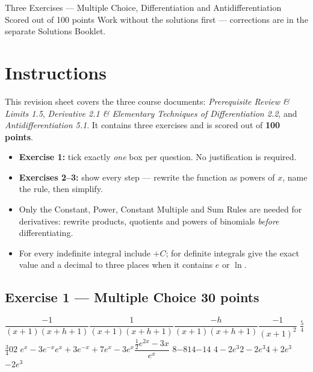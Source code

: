 \documentclass[11pt]{article}
\begin{document}
%
{Three Exercises --- Multiple Choice, Differentiation and Antidifferentiation\\ Scored out of 100 points}%
{Work without the solutions first --- corrections are in the separate Solutions Booklet.}

\section*{Instructions}
\studentbox
\bigskip
This revision sheet covers the three course documents: \emph{Prerequisite Review \& Limits 1.5},
\emph{Derivative 2.1 \& Elementary Techniques of Differentiation 2.2}, and
\emph{Antidifferentiation 5.1}. It contains three exercises and is scored out of \textbf{100 points}.
\begin{itemize}[itemsep=2pt]
  \item \textbf{Exercise 1:} tick exactly \emph{one} box per question. No justification is required.
  \item \textbf{Exercises 2--3:} show every step --- rewrite the function as powers of $x$, name the rule, then simplify.
  \item Only the Constant, Power, Constant Multiple and Sum Rules are needed for derivatives: rewrite products, quotients and powers of binomials \emph{before} differentiating.
  \item For every indefinite integral include $+C$; for definite integrals give the exact value and a decimal to three places when it contains $e$ or $\ln$.
\end{itemize}
\scoretable

\newpage
\subsection*{Exercise 1 --- Multiple Choice \hfill {\normalsize\color{fnavy}30 points}}
\begin{enumerate}[label=\textbf{Q\arabic*.},leftmargin=*,itemsep=10pt]
  {$\dfrac{-1}{(x+1)(x+h+1)}$}{$\dfrac{1}{(x+1)(x+h+1)}$}{$\dfrac{-h}{(x+1)(x+h+1)}$}{$\dfrac{-1}{(x+1)^2}$}
  {$\tfrac54$}{$\tfrac34$}{$0$}{$2$}
  {$e^{x}-3e^{-x}$}{$e^{x}+3e^{-x}+7$}{$e^{x}-3e^{x}$}{$\dfrac{\frac12 e^{2x}-3x}{e^{x}}$}
  {$8$}{$-8$}{$14$}{$-14$}
  {$4-2e^3$}{$2-2e^3$}{$4+2e^3$}{$-2e^3$}
\end{enumerate}
\end{document}
